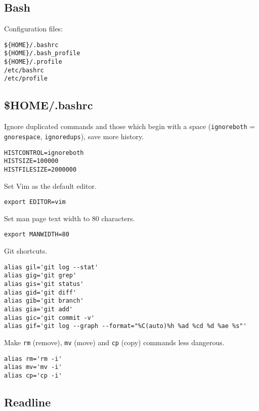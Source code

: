 \documentclass[12pt,a4paper]{article}
\begin{document}
\subsection{Bash}

Configuration files:

\begin{verbatim}
${HOME}/.bashrc
${HOME}/.bash_profile
${HOME}/.profile
/etc/bashrc
/etc/profile
\end{verbatim}

\subsection{\$HOME/.bashrc}

Ignore duplicated commands and those which begin with a space (\verb"ignoreboth"
= \verb"gnorespace", \verb"ignoredups"), save more history.

\begin{verbatim}
HISTCONTROL=ignoreboth
HISTSIZE=100000
HISTFILESIZE=2000000
\end{verbatim}

Set Vim as the default editor.

\begin{verbatim}
export EDITOR=vim
\end{verbatim}

Set man page text width to 80 characters.

\begin{verbatim}
export MANWIDTH=80
\end{verbatim}

Git shortcuts.

\begin{verbatim}
alias gil='git log --stat'
alias gig='git grep'
alias gis='git status'
alias gid='git diff'
alias gib='git branch'
alias gia='git add'
alias gic='git commit -v'
alias gif='git log --graph --format="%C(auto)%h %ad %cd %d %ae %s"'
\end{verbatim}

Make \texttt{rm} (remove), \texttt{mv} (move) and \texttt{cp} (copy) commands less dangerous.

\begin{verbatim}
alias rm='rm -i'
alias mv='mv -i'
alias cp='cp -i'
\end{verbatim}

\subsection{Readline}
\end{document}
